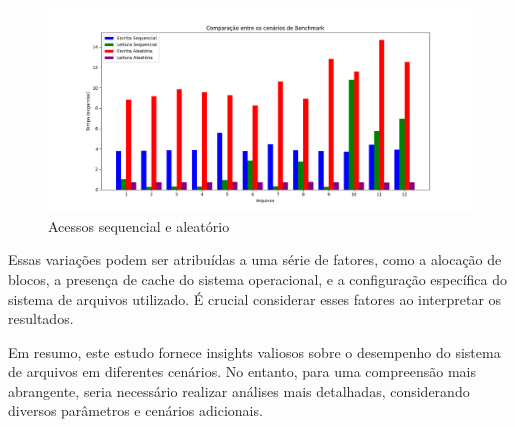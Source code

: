 \documentclass[
	12pt,				%
	openright,			%
	oneside,			%
	a4paper,			%
	chapter=TITLE,		%
	english,			%
	french,				%
	spanish,			%
	brazil				%
	]{abntex2}
\theoremstyle{definition}
\begin{document}
\begin{figure}[H]
	\centering
	\includegraphics[width=1.0\textwidth]{oneforall_grafico.png}
	\caption{Acessos sequencial e aleatório}
	\label{fig:oneforall}
\end{figure}


Essas variações podem ser atribuídas a uma série de fatores, como a 
alocação de blocos, a presença de cache do sistema operacional, e a 
configuração específica do sistema de arquivos utilizado. É crucial 
considerar esses fatores ao interpretar os resultados.

Em resumo, este estudo fornece insights valiosos sobre o desempenho do 
sistema de arquivos em diferentes cenários. No entanto, para uma compreensão 
mais abrangente, seria necessário realizar análises mais detalhadas, 
considerando diversos parâmetros e cenários adicionais.
\postextual



\cite{FAIRBANKS2012S118}
\cite{bovet_cesati_2005}
\cite{Tso}
\cite{matur}
\cite{kumar}
\cite{carrier2005file}
\end{document}
